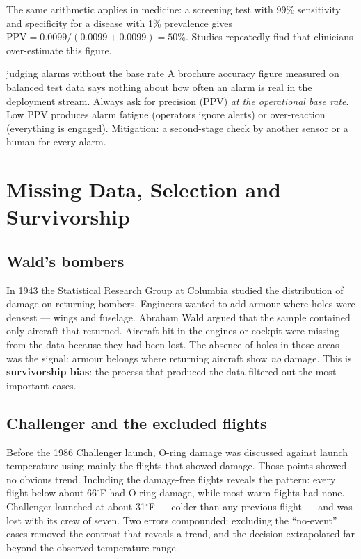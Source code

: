 \documentclass[11pt]{article}
\begin{document}
The same arithmetic applies in medicine: a screening test with 99\% sensitivity and specificity for a disease with 1\% prevalence gives $\text{PPV}=0.0099/(0.0099+0.0099)=50\%$. Studies repeatedly find that clinicians over-estimate this figure.

\begin{pitfall}{judging alarms without the base rate}
A brochure accuracy figure measured on balanced test data says nothing about how often an alarm is real in the deployment stream. Always ask for precision (PPV) \emph{at the operational base rate}. Low PPV produces alarm fatigue (operators ignore alerts) or over-reaction (everything is engaged). Mitigation: a second-stage check by another sensor or a human for every alarm.
\end{pitfall}

\section{Missing Data, Selection and Survivorship}
\subsection{Wald's bombers}
In 1943 the Statistical Research Group at Columbia studied the distribution of damage on returning bombers. Engineers wanted to add armour where holes were densest --- wings and fuselage. Abraham Wald argued that the sample contained only aircraft that returned. Aircraft hit in the engines or cockpit were missing from the data because they had been lost. The absence of holes in those areas was the signal: armour belongs where returning aircraft show \emph{no} damage. This is \textbf{survivorship bias}: the process that produced the data filtered out the most important cases.

\subsection{Challenger and the excluded flights}
Before the 1986 Challenger launch, O-ring damage was discussed against launch temperature using mainly the flights that showed damage. Those points showed no obvious trend. Including the damage-free flights reveals the pattern: every flight below about 66$^\circ$F had O-ring damage, while most warm flights had none. Challenger launched at about 31$^\circ$F --- colder than any previous flight --- and was lost with its crew of seven. Two errors compounded: excluding the ``no-event'' cases removed the contrast that reveals a trend, and the decision extrapolated far beyond the observed temperature range.
\end{document}
